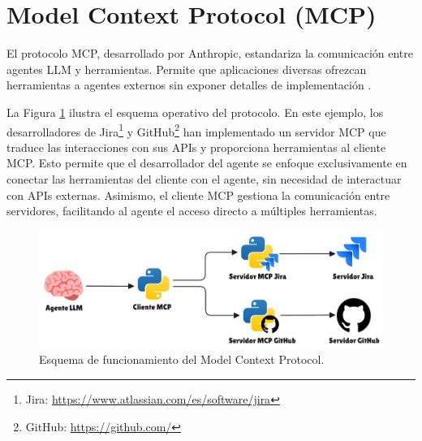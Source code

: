 \section{Model Context Protocol (MCP)}
\label{sec:mcp_prots}
El protocolo MCP, desarrollado por Anthropic, estandariza la comunicación entre agentes LLM y herramientas. Permite que aplicaciones diversas ofrezcan herramientas a agentes externos sin exponer detalles de implementación \cite{anthropic_model_2024}.

La Figura \ref{fig:mcp} ilustra el esquema operativo del protocolo. En este ejemplo, los desarrolladores de Jira\footnote{Jira: \url{https://www.atlassian.com/es/software/jira}} y GitHub\footnote{GitHub: \url{https://github.com/}} han implementado un servidor MCP que traduce las interacciones con sus APIs y proporciona herramientas al cliente MCP. Esto permite que el desarrollador del agente se enfoque exclusivamente en conectar las herramientas del cliente con el agente, sin necesidad de interactuar con APIs externas. Asimismo, el cliente MCP gestiona la comunicación entre servidores, facilitando al agente el acceso directo a múltiples herramientas.

\begin{figure}[h]
  \centering
  \includegraphics[width=1\linewidth]{figures/mcp.png}
  \caption{Esquema de funcionamiento del Model Context Protocol.}
  \label{fig:mcp}
\end{figure}


